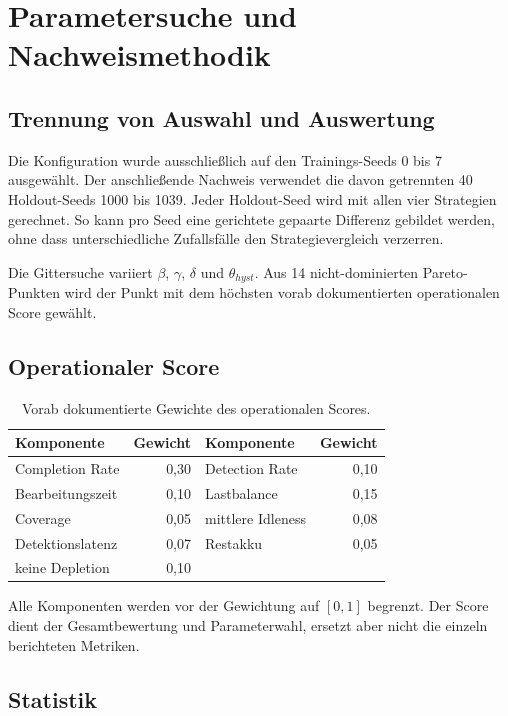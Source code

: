 \documentclass[11pt,a4paper]{article}
\begin{document}
\section{Parametersuche und Nachweismethodik}

\subsection{Trennung von Auswahl und Auswertung}

Die Konfiguration wurde ausschließlich auf den Trainings-Seeds 0 bis 7 ausgewählt. Der
anschließende Nachweis verwendet die davon getrennten 40 Holdout-Seeds 1000 bis 1039.
Jeder Holdout-Seed wird mit allen vier Strategien gerechnet. So kann pro Seed eine
gerichtete gepaarte Differenz gebildet werden, ohne dass unterschiedliche Zufallsfälle
den Strategievergleich verzerren.

Die Gittersuche variiert $\beta$, $\gamma$, $\delta$ und $\theta_{hyst}$. Aus 14
nicht-dominierten Pareto-Punkten wird der Punkt mit dem höchsten vorab dokumentierten
operationalen Score gewählt.

\subsection{Operationaler Score}

\begin{table}[H]
\centering
\small
\begin{tabular}{@{}lr@{\qquad}lr@{}}
\toprule
Komponente & Gewicht & Komponente & Gewicht\\
\midrule
Completion Rate & 0,30 & Detection Rate & 0,10\\
Bearbeitungszeit & 0,10 & Lastbalance & 0,15\\
Coverage & 0,05 & mittlere Idleness & 0,08\\
Detektionslatenz & 0,07 & Restakku & 0,05\\
keine Depletion & 0,10 & & \\
\bottomrule
\end{tabular}
\caption{Vorab dokumentierte Gewichte des operationalen Scores.}
\end{table}

Alle Komponenten werden vor der Gewichtung auf $[0,1]$ begrenzt. Der Score dient der
Gesamtbewertung und Parameterwahl, ersetzt aber nicht die einzeln berichteten Metriken.

\subsection{Statistik}
\end{document}
